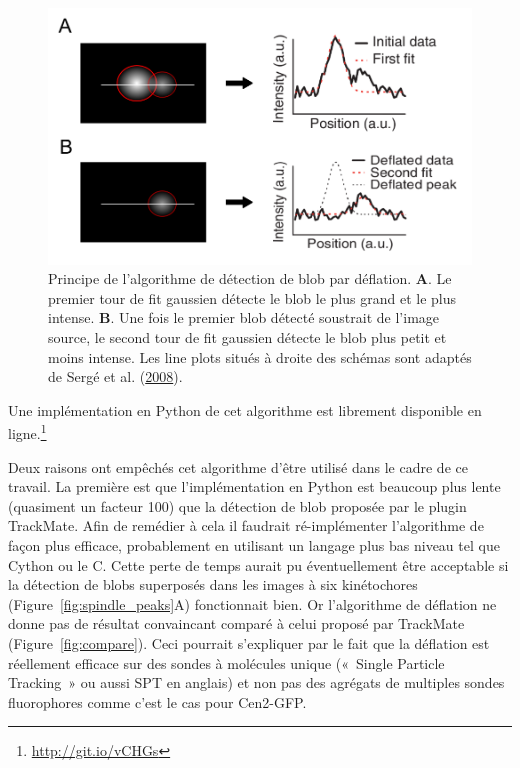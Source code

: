 \documentclass[12pt,a4paper,twoside,openright]{book}
\begin{document}
\begin{figure}[htbp]
\centering
\includegraphics{figures/results/imaging/deflation.png}
\caption{\label{fig:deflation}Principe de l'algorithme de détection de
blob par déflation. \textbf{A}. Le premier tour de fit gaussien détecte
le blob le plus grand et le plus intense. \textbf{B}. Une fois le
premier blob détecté soustrait de l'image source, le second tour de fit
gaussien détecte le blob plus petit et moins intense. Les line plots
situés à droite des schémas sont adaptés de Sergé et al.
(\protect\hyperlink{ref-Serge2008}{2008}).}
\end{figure}

Une implémentation en Python de cet algorithme est librement disponible
en ligne.\footnote{\url{http://git.io/vCHGs}}

Deux raisons ont empêchés cet algorithme d'être utilisé dans le cadre de
ce travail. La première est que l'implémentation en Python est beaucoup
plus lente (quasiment un facteur 100) que la détection de blob proposée
par le plugin TrackMate. Afin de remédier à cela il faudrait
ré-implémenter l'algorithme de façon plus efficace, probablement en
utilisant un langage plus bas niveau tel que Cython ou le C. Cette perte
de temps aurait pu éventuellement être acceptable si la détection de
blobs superposés dans les images à six kinétochores
(Figure~\ref{fig:spindle_peaks}A) fonctionnait bien. Or l'algorithme de
déflation ne donne pas de résultat convaincant comparé à celui proposé
par TrackMate (Figure~\ref{fig:compare}). Ceci pourrait s'expliquer par
le fait que la déflation est réellement efficace sur des sondes à
molécules unique («~Single Particle Tracking~» ou aussi SPT en anglais)
et non pas des agrégats de multiples sondes fluorophores comme c'est le
cas pour Cen2-GFP.
\end{document}
